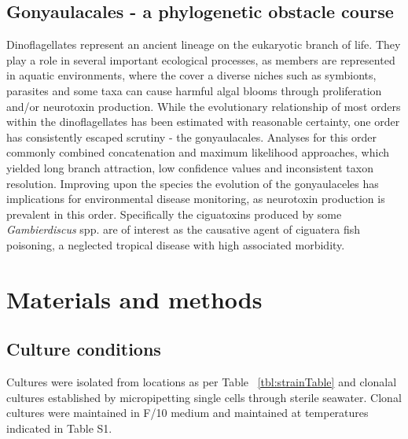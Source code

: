 \documentclass[12pt]{article}
\begin{document}
\subsection*{Gonyaulacales - a phylogenetic obstacle course}
Dinoflagellates represent an ancient lineage on the eukaryotic branch of life. 
They play a role in several important ecological processes, as members are represented in aquatic environments, where the cover a diverse niches such as symbionts, parasites and some taxa can cause harmful algal blooms through proliferation and/or neurotoxin production.
While the evolutionary relationship of most orders within the dinoflagellates has been estimated with reasonable certainty, one order has consistently escaped scrutiny - the gonyaulacales. 
Analyses for this order commonly combined concatenation and maximum likelihood approaches, which yielded long branch attraction, low confidence values and inconsistent taxon resolution. 
Improving upon the species the evolution of the gonyaulaceles has implications for environmental disease monitoring, as neurotoxin production is prevalent in this order. 
Specifically the ciguatoxins produced by some \emph{Gambierdiscus} spp. are of interest as the causative agent of ciguatera fish poisoning, a neglected tropical disease with high associated morbidity.%
\newpage
\section{Materials and methods}
\subsection*{Culture conditions}
\FloatBarrier
Cultures were isolated from locations as per Table ~\ref{tbl:strainTable} and clonalal cultures established by micropipetting single cells through sterile seawater. Clonal cultures were maintained in F/10 medium and maintained at temperatures indicated in Table S1.
\end{document}
